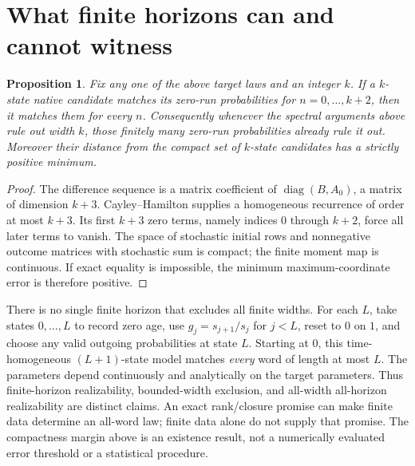 \documentclass[11pt]{article}
\newtheorem{proposition}[theorem]{Proposition}
\begin{document}
\section{What finite horizons can and cannot witness}
\begin{proposition}\label{prop:finite}
Fix any one of the above target laws and an integer $k$. If a $k$-state native candidate matches its zero-run probabilities for $n=0,\ldots,k+2$, then it matches them for every $n$. Consequently whenever the spectral arguments above rule out width $k$, those finitely many zero-run probabilities already rule it out. Moreover their distance from the compact set of $k$-state candidates has a strictly positive minimum.
\end{proposition}
\begin{proof}
The difference sequence is a matrix coefficient of $\operatorname{diag}(B,A_0)$, a matrix of dimension $k+3$. Cayley--Hamilton supplies a homogeneous recurrence of order at most $k+3$. Its first $k+3$ zero terms, namely indices $0$ through $k+2$, force all later terms to vanish. The space of stochastic initial rows and nonnegative outcome matrices with stochastic sum is compact; the finite moment map is continuous. If exact equality is impossible, the minimum maximum-coordinate error is therefore positive.
\end{proof}

There is no single finite horizon that excludes all finite widths. For each $L$, take states $0,\ldots,L$ to record zero age, use $g_j=s_{j+1}/s_j$ for $j<L$, reset to $0$ on $1$, and choose any valid outgoing probabilities at state $L$. Starting at $0$, this time-homogeneous $(L+1)$-state model matches \emph{every} word of length at most $L$. The parameters depend continuously and analytically on the target parameters. Thus finite-horizon realizability, bounded-width exclusion, and all-width all-horizon realizability are distinct claims. An exact rank/closure promise can make finite data determine an all-word law; finite data alone do not supply that promise. The compactness margin above is an existence result, not a numerically evaluated error threshold or a statistical procedure.
\end{document}

